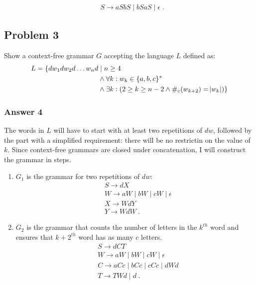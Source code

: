 \documentclass[11pt]{article}
\begin{document}
\begin{align*}
  &S \to aSbS \;|\; bSaS \;|\; \epsilon \;.
\end{align*}

\subsection{Problem 3}
\label{sec:orgheadline7}
Show a context-free grammar \(G\) accepting the language \(L\) defined as:
\begin{align*}
  L = \{dw_1dw_2d \dots w_nd &\;|\; n \geq 4 \\
                             &\land \forall k: w_k \in \{a,b,c\}^* \\
                             &\land \exists k: (2 \geq k \geq n-2 \land \#_c(w_{k+2}) = \abs{w_k})\}
\end{align*}

\subsubsection{Answer 4}
\label{sec:orgheadline6}
The words in \(L\) will have to start with at least two repetitions of \(dw\),
followed by the part with a simplified requirement: there will be no
restrictin on the value of \(k\).  Since context-free grammars are closed
under concatenation, I will construct the grammar in steps.

\begin{enumerate}
\item \(G_1\) is the grammar for two repetitions of \(dw\):
\begin{align*}
  &S \to dX \\
  &W \to aW \;|\; bW \;|\; cW \;|\; \epsilon \\
  &X \to WdY \\
  &Y \to WdW \;.
\end{align*}

\item \(G_2\) is the grammar that counts the number of letters in the \(k^{th}\) word
and ensures that \(k+2^{th}\) word has as many \(c\) letters.
\begin{align*}
  &S \to dCT \\
  &W \to aW \;|\; bW \;|\; cW \;|\; \epsilon \\
  &C \to aCc \;|\; bCc \;|\; cCc \;|\; dWd \\
  &T \to TWd \;|\; d \;.
\end{align*}
\end{enumerate}
\end{document}

